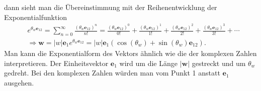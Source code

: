 dann sieht man die Übereinstimmung mit der Reihenentwicklung der Exponentialfunktion
\begin{align}
	&e^{\theta_w\mathbf{e}_{12}}=\sum _{n=0}^{\infty }{\frac {(\theta_w\mathbf{e}_{12})^{n}}{n!}}={\frac {(\theta_w\mathbf{e}_{12})^{0}}{0!}}+{\frac {(\theta_w\mathbf{e}_{12})^{1}}{1!}}+{\frac {(\theta_w\mathbf{e}_{12})^{2}}{2!}}+{\frac {(\theta_w\mathbf{e}_{12})^{3}}{3!}}+\cdots\\
	&\Rightarrow \mathbf{w} = |w|\mathbf{e}_1 e^{\theta_w \mathbf{e}_{12}} = |w|\mathbf{e}_1\left(\cos(\theta_w)+ \sin(\theta_w) \mathbf{e}_{12}\right).
\end{align}
Man kann die Exponentialform des Vektors ähnlich wie die der komplexen Zahlen interpretieren. Der Einheitsvektor $\mathbf{e}_1$ wird um die Länge $|\mathbf{w}|$ gestreckt und um $\theta_w$ gedreht.
Bei den komplexen Zahlen würden man vom Punkt 1 anstatt $\mathbf{e}_1$ ausgehen.
